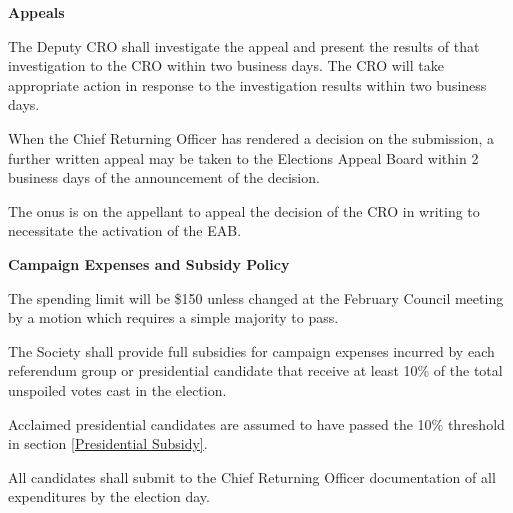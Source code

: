 \begin{longenum}[ label*=\thesection.\arabic*., align=left]
 \item \textbf{Appeals}
 \begin{longenum}[label*=\arabic*., align=left]
 \item The Deputy CRO shall investigate the appeal and present the results of that investigation to the CRO within  two business days. The CRO will  take appropriate action in response  to  the investigation results within two business days.
\item  When  the  Chief  Returning  Officer  has  rendered  a  decision  on  the  submission,  a  further  written appeal may be taken to the Elections Appeal Board within 2 business days of the announcement of the decision.
\item The onus is on the appellant to appeal the decision of the CRO in writing to necessitate the activation of the EAB.
  \end{longenum}
  \item \textbf{Campaign Expenses and Subsidy Policy}	
  \begin{longenum}[label*=\arabic*., align=left]
  \item The spending limit will be \$150 unless changed at the February Council meeting by a motion which requires a simple majority to pass.
\item \label{Presidential Subsidy}The Society shall provide full subsidies for campaign expenses incurred by each referendum group or presidential candidate that receive at least 10\% of the total unspoiled votes cast in the election.  
			\begin{longenum}[label*=\arabic*., align=left]
			\item  Acclaimed  presidential  candidates  are  assumed  to  have  passed  the  10\%  threshold  in section \ref{Presidential Subsidy}.
			\end{longenum}
\item All candidates shall submit to the Chief Returning Officer documentation of all expenditures by the election day.
 \end{longenum}
\end{longenum}
